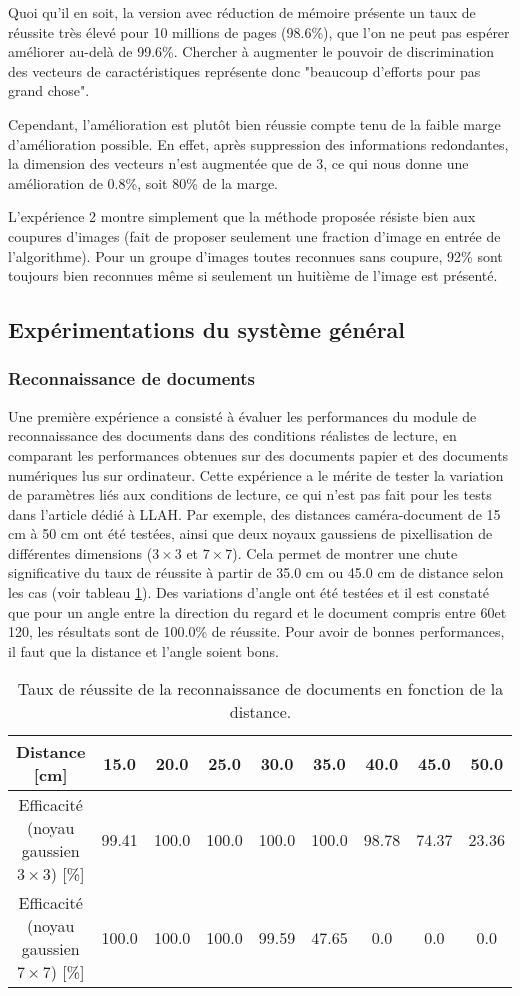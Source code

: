 \documentclass[a4paper]{article}
\begin{document}
Quoi qu'il en soit, la version avec réduction de mémoire présente un taux de réussite très élevé pour 10 millions de pages (98.6\%), que l'on ne peut pas espérer améliorer au-delà de 99.6\%. Chercher à augmenter le pouvoir de discrimination des vecteurs de caractéristiques représente donc "beaucoup d'efforts pour pas grand chose".

Cependant, l'amélioration est plutôt bien réussie compte tenu de la faible marge d'amélioration possible. En effet, après suppression des informations redondantes, la dimension des vecteurs n'est augmentée que de 3, ce qui nous donne une amélioration de 0.8\%, soit 80\% de la marge.

L'expérience 2 montre simplement que la méthode proposée résiste bien aux coupures d'images (fait de proposer seulement une fraction d'image en entrée de l'algorithme). Pour un groupe d'images toutes reconnues sans coupure, 92\% sont toujours bien reconnues même si seulement un huitième de l'image est présenté.

\subsection{Expérimentations du système général}

\subsubsection{Reconnaissance de documents}
Une première expérience a consisté à évaluer les performances du module de reconnaissance des documents dans des conditions réalistes de lecture, en comparant les performances obtenues sur des documents papier et des documents numériques lus sur ordinateur. Cette expérience a le mérite de tester la variation de paramètres liés aux conditions de lecture, ce qui n'est pas fait pour les tests dans l'article dédié à LLAH. Par exemple, des distances caméra-document de 15 cm à 50 cm ont été testées, ainsi que deux noyaux gaussiens de pixellisation de différentes dimensions ($3 \times 3$ et $7 \times 7$). Cela permet de montrer une chute significative du taux de réussite à partir de 35.0 cm ou 45.0 cm de distance selon les cas (voir tableau \ref{tab:results}). Des variations d'angle ont été testées et il est constaté que pour un angle entre la direction du regard et le document compris entre 60\degree et 120\degree, les résultats sont de 100.0\% de réussite. Pour avoir de bonnes performances, il faut que la distance et l'angle soient bons.

\begin{table}[!h]
\begin{tabular}{c|c|c|c|c|c|c|c|c}
Distance [cm] & 15.0 & 20.0 & 25.0 & 30.0 & 35.0 & 40.0 & 45.0 & 50.0 \\\hline
Efficacité (noyau gaussien $3 \times 3$) [\%] & 99.41 & 100.0 & 100.0 & 100.0 & 100.0 & 98.78 & 74.37 & 23.36 \\\hline
Efficacité (noyau gaussien $7 \times 7$) [\%] & 100.0 & 100.0 & 100.0 & 99.59 & 47.65 & 0.0 & 0.0 & 0.0
\end{tabular}
\caption{\label{tab:results}Taux de réussite de la reconnaissance de documents en fonction de la distance.}
\end{table}
\end{document}
